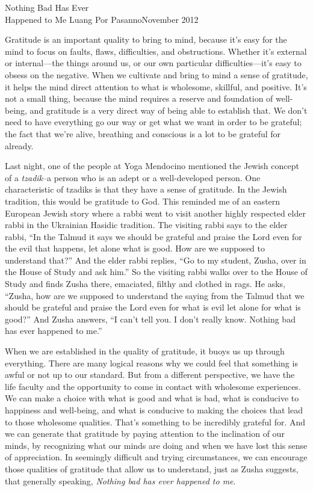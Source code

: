 {Nothing Bad Has Ever\\Happened to Me}
{Luang Por Pasanno}{November 2012}

Gratitude is an important quality to bring to mind, because it's easy 
for the mind to focus on faults, flaws, difficulties, and obstructions. 
Whether it's external or internal---the things around us, or our own 
particular difficulties---it's easy to obsess on the negative. When we 
cultivate and bring to mind a sense of gratitude, it helps the mind 
direct attention to what is wholesome, skillful, and positive. It's not 
a small thing, because the mind requires a reserve and foundation of 
well-being, and gratitude is a very direct way of being able to 
establish that. We don't need to have everything go our way or get what 
we want in order to be grateful; the fact that we're alive, breathing 
and conscious is a lot to be grateful for already.

Last night, one of the people at Yoga Mendocino mentioned the Jewish 
concept of a \emph{tzadik}–a person who is an adept or a 
well-developed person. One characteristic of tzadiks is that they have 
a sense of gratitude. In the Jewish tradition, this would be gratitude 
to God. This reminded me of an eastern European Jewish story where a 
rabbi went to visit another highly respected elder rabbi in the 
Ukrainian Hasidic tradition. The visiting rabbi says to the elder 
rabbi, ``In the Talmud it says we should be grateful and praise the 
Lord even for the evil that happens, let alone what is good. How are we 
supposed to understand that?'' And the elder rabbi replies, ``Go to my 
student, Zusha, over in the House of Study and ask him.'' So the 
visiting rabbi walks over to the House of Study and finds Zusha there, 
emaciated, filthy and clothed in rags. He asks, ``Zusha, how are we 
supposed to understand the saying from the Talmud that we should be 
grateful and praise the Lord even for what is evil let alone for what 
is good?'' And Zusha answers, ``I can't tell you. I don't really know. 
Nothing bad has ever happened to me.''

When we are established in the quality of gratitude, it buoys us up 
through everything. There are many logical reasons why we could feel 
that something is awful or not up to our standard. But from a different 
perspective, we have the life faculty and the opportunity to come in 
contact with wholesome experiences. We can make a choice with what is 
good and what is bad, what is conducive to happiness and well-being, 
and what is conducive to making the choices that lead to those 
wholesome qualities. That's something to be incredibly grateful for. 
And we can generate that gratitude by paying attention to the 
inclination of our minds, by recognizing what our minds are doing and 
when we have lost this sense of appreciation. In seemingly difficult 
and trying circumstances, we can encourage those qualities of gratitude 
that allow us to understand, just as Zusha suggests, that generally 
speaking, \emph{Nothing bad has ever happened to me}.

